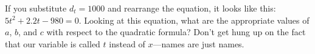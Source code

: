 \documentclass{article}
\newenvironment{hint}
    {\begin{tcolorbox}[title=Hint,colframe=white!70!blue,colback=white]}
    {\end{tcolorbox}}
\begin{document}
\begin{hint}
    If you substitute $d_t = 1000$ and rearrange the equation, it looks like this: $5t^2 + 2.2t - 980 = 0$. Looking at this equation, what are the appropriate values of $a$, $b$, and $c$ with respect to the quadratic formula? Don't get hung up on the fact that our variable is called $t$ instead of $x$---names are just names.
\end{hint}
\end{document}

